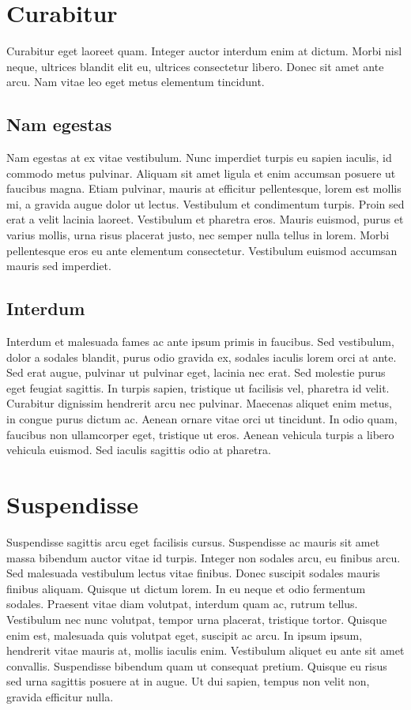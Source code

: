 \documentclass{ClassTeX}
\begin{document}
	 \section{Curabitur}
	 Curabitur eget laoreet quam. Integer auctor interdum enim at dictum. Morbi nisl neque, ultrices blandit elit eu, ultrices consectetur libero. Donec sit amet ante arcu. Nam vitae leo eget metus elementum tincidunt. 
	 \subsection{Nam egestas}
	 Nam egestas at ex vitae vestibulum. Nunc imperdiet turpis eu sapien iaculis, id commodo metus pulvinar. Aliquam sit amet ligula et enim accumsan posuere ut faucibus magna. Etiam pulvinar, mauris at efficitur pellentesque, lorem est mollis mi, a gravida augue dolor ut lectus. Vestibulum et condimentum turpis. Proin sed erat a velit lacinia laoreet. Vestibulum et pharetra eros. 
	 Mauris euismod, purus et varius mollis, urna risus placerat justo, nec semper nulla tellus in lorem. Morbi pellentesque eros eu ante elementum consectetur. Vestibulum euismod accumsan mauris sed imperdiet.
	 
	 \subsection{Interdum}
	 Interdum et malesuada fames ac ante ipsum primis in faucibus. Sed vestibulum, dolor a sodales blandit, purus odio gravida ex, sodales iaculis lorem orci at ante. Sed erat augue, pulvinar ut pulvinar eget, lacinia nec erat. Sed molestie purus eget feugiat sagittis. In turpis sapien, tristique ut facilisis vel, pharetra id velit. Curabitur dignissim hendrerit arcu nec pulvinar. Maecenas aliquet enim metus, in congue purus dictum ac. Aenean ornare vitae orci ut tincidunt. In odio quam, faucibus non ullamcorper eget, tristique ut eros. Aenean vehicula turpis a libero vehicula euismod. Sed iaculis sagittis odio at pharetra.
	 
	 \section{Suspendisse}
	 Suspendisse sagittis arcu eget facilisis cursus. Suspendisse ac mauris sit amet massa bibendum auctor vitae id turpis. Integer non sodales arcu, eu finibus arcu. Sed malesuada vestibulum lectus vitae finibus. Donec suscipit sodales mauris finibus aliquam. Quisque ut dictum lorem. In eu neque et odio fermentum sodales. Praesent vitae diam volutpat, interdum quam ac, rutrum tellus. Vestibulum nec nunc volutpat, tempor urna placerat, tristique tortor. Quisque enim est, malesuada quis volutpat eget, suscipit ac arcu. In ipsum ipsum, hendrerit vitae mauris at, mollis iaculis enim. Vestibulum aliquet eu ante sit amet convallis. Suspendisse bibendum quam ut consequat pretium. Quisque eu risus sed urna sagittis posuere at in augue. Ut dui sapien, tempus non velit non, gravida efficitur nulla.
	
\end{document}
